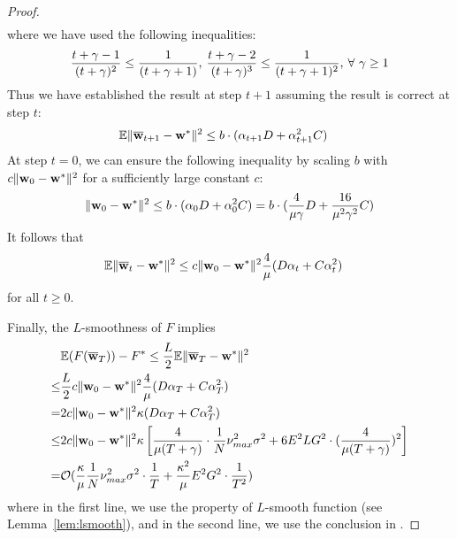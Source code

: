 \begin{proof}
\begin{align*}
	\end{align*}
	where we have used the following inequalities:
	\begin{align*}
	\frac{t+\gamma-1}{(t+\gamma)^{2}} \leq\frac{1}{(t+\gamma+1)},\hspace{0.2em} 
	\frac{t+\gamma-2}{(t+\gamma)^{3}} \leq\frac{1}{(t+\gamma+1)^{2}}, \hspace{0.2em}  \forall\ \gamma\geq1
	\end{align*}
	Thus we have established the result at step $t+1$ assuming the result is correct at step $t$:
	\begin{align*}
	\mathbb{E}\|{\overline{\mathbf{w}}}_{t+1}-{\mathbf{w}}^{\ast}\|^{2} & \leq b\cdot(\alpha_{t+1}D+\alpha_{t+1}^{2}C)
	\end{align*}
	At step $t=0$, we can ensure the following inequality by scaling $b$ with $c\|{\mathbf{w}}_{0}-{\mathbf{w}}^{\ast}\|^{2}$ for a sufficiently large constant
	$c$:
	\begin{align*}
	\|{\mathbf{w}}_{0}-{\mathbf{w}}^{\ast}\|^{2} \leq b\cdot(\alpha_{0}D+\alpha_{0}^{2}C) =b\cdot(\frac{4}{\mu\gamma}D+\frac{16}{\mu^{2}\gamma^{2}}C)
	\end{align*}
	It follows that 
	\begin{align}
	\mathbb{E}\|\ov{w}_{t}-\vw^{\ast}\|^{2} & \leq c\|\vw_{0}-\vw^{\ast}\|^{2}\frac{4}{\mu}(D\alpha_{t}+C\alpha_{t}^{2})
	\label{eq:th1:1}
	\end{align}
	for all $t\geq0$. 
	
	Finally, the $L$-smoothness of $F$ implies 
	\begin{align*}
	& \mathbb{E}(F({\overline{\mathbf{w}}}_{T}))-F^{\ast} \leq \frac{L}{2}\mathbb{E}\|{\overline{\mathbf{w}}}_{T}-{\mathbf{w}}^{\ast}\|^{2}\\ 
	\leq &\frac{L}{2}c\|{\mathbf{w}}_{0}-{\mathbf{w}}^{\ast}\|^{2}\frac{4}{\mu}(D\alpha_{T}+C\alpha_{T}^{2})\\
	=& 2c\|{\mathbf{w}}_{0}-{\mathbf{w}}^{\ast}\|^{2}\kappa(D\alpha_{T}+C\alpha_{T}^{2})\\
	\leq &2c\|{\mathbf{w}}_{0}-{\mathbf{w}}^{\ast}\|^{2}\kappa\left[\frac{4}{\mu(T+\gamma)}\cdot\frac{1}{N}\nu_{max}^{2}\sigma^{2}+6E^{2}LG^{2}\cdot(\frac{4}{\mu(T+\gamma)})^{2}\right]\\
	=& \mathcal{O}(\frac{\kappa}{\mu}\frac{1}{N}\nu_{max}^{2}\sigma^{2}\cdot\frac{1}{T}+\frac{\kappa^{2}}{\mu}E^{2}G^{2}\cdot\frac{1}{T^{2}})
	\end{align*}
	where in the first line, we use the property of $L$-smooth function (see Lemma~\ref{lem:lsmooth}), and in the second line, we use the conclusion in \eq{\ref{eq:th1:1}}. 
	

\end{proof}
